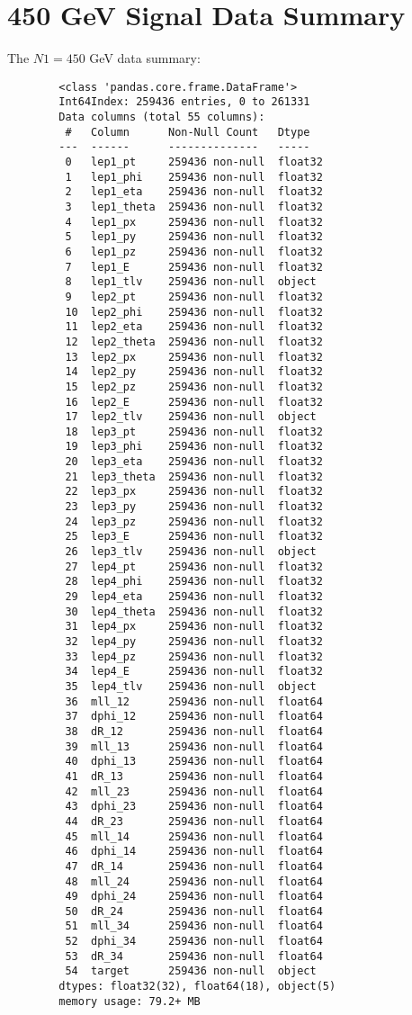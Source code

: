\documentclass[a4paper, american, 12pt]{report}
\begin{document}
	

	
	\chapter{450 GeV Signal Data Summary}
	\label{appendix:Signal450_Summary}
	The $N1=450$ GeV data summary:
	\begin{lstlisting}
		<class 'pandas.core.frame.DataFrame'>
		Int64Index: 259436 entries, 0 to 261331
		Data columns (total 55 columns):
		 #   Column      Non-Null Count   Dtype
		---  ------      --------------   -----
		 0   lep1_pt     259436 non-null  float32
		 1   lep1_phi    259436 non-null  float32
		 2   lep1_eta    259436 non-null  float32
		 3   lep1_theta  259436 non-null  float32
		 4   lep1_px     259436 non-null  float32
		 5   lep1_py     259436 non-null  float32
		 6   lep1_pz     259436 non-null  float32
		 7   lep1_E      259436 non-null  float32
		 8   lep1_tlv    259436 non-null  object
		 9   lep2_pt     259436 non-null  float32
		 10  lep2_phi    259436 non-null  float32
		 11  lep2_eta    259436 non-null  float32
		 12  lep2_theta  259436 non-null  float32
		 13  lep2_px     259436 non-null  float32
		 14  lep2_py     259436 non-null  float32
		 15  lep2_pz     259436 non-null  float32
		 16  lep2_E      259436 non-null  float32
		 17  lep2_tlv    259436 non-null  object
		 18  lep3_pt     259436 non-null  float32
		 19  lep3_phi    259436 non-null  float32
		 20  lep3_eta    259436 non-null  float32
		 21  lep3_theta  259436 non-null  float32
		 22  lep3_px     259436 non-null  float32
		 23  lep3_py     259436 non-null  float32
		 24  lep3_pz     259436 non-null  float32
		 25  lep3_E      259436 non-null  float32
		 26  lep3_tlv    259436 non-null  object
		 27  lep4_pt     259436 non-null  float32
		 28  lep4_phi    259436 non-null  float32
		 29  lep4_eta    259436 non-null  float32
		 30  lep4_theta  259436 non-null  float32
		 31  lep4_px     259436 non-null  float32
		 32  lep4_py     259436 non-null  float32
		 33  lep4_pz     259436 non-null  float32
		 34  lep4_E      259436 non-null  float32
		 35  lep4_tlv    259436 non-null  object
		 36  mll_12      259436 non-null  float64
		 37  dphi_12     259436 non-null  float64
		 38  dR_12       259436 non-null  float64
		 39  mll_13      259436 non-null  float64
		 40  dphi_13     259436 non-null  float64
		 41  dR_13       259436 non-null  float64
		 42  mll_23      259436 non-null  float64
		 43  dphi_23     259436 non-null  float64
		 44  dR_23       259436 non-null  float64
		 45  mll_14      259436 non-null  float64
		 46  dphi_14     259436 non-null  float64
		 47  dR_14       259436 non-null  float64
		 48  mll_24      259436 non-null  float64
		 49  dphi_24     259436 non-null  float64
		 50  dR_24       259436 non-null  float64
		 51  mll_34      259436 non-null  float64
		 52  dphi_34     259436 non-null  float64
		 53  dR_34       259436 non-null  float64
		 54  target      259436 non-null  object
		dtypes: float32(32), float64(18), object(5)
		memory usage: 79.2+ MB
		

\end{lstlisting}
\end{document}
